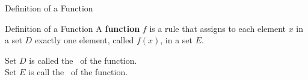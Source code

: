 \documentclass{beamer}
\begin{document}
\begin{frame}[t]{Definition of a Function}\vspace{10pt}
  \begin{block}{Definition of a Function}
    \vspace{0.5em}
    A \textbf{function} $f$ is a rule that assigns to each element $x$ in a set $D$ exactly one element, called $f(x)$, in a set $E$.
          \vspace{0.5em}
  \end{block}

\vspace{10pt}
Set $D$ is called the 
\, of the function. \\ [10pt]
Set $E$ is call the  
\, of the function. 
\end{frame}
\end{document}
